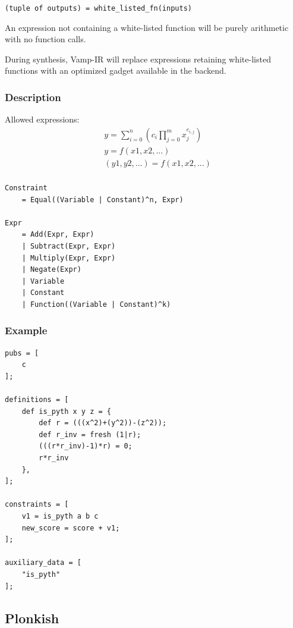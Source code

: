 \documentclass[
    9pt,            %
    techreport,        %
    affiltop,       %
]{art}
\begin{document}
\texttt{(tuple of outputs) = white\_listed\_fn(inputs)}

An expression not containing a white-listed function will be purely arithmetic with no function calls.

During synthesis, Vamp-IR will replace expressions retaining white-listed functions with an optimized gadget available in the backend. 

\subsubsection{Description}

Allowed expressions:
\begin{align*}
  &y = \sum_{i=0}^n\left(c_i\prod_{j=0}^m x_j^{e_{i,j}}\right)\\
  &y = f(x1, x2, ...)\\
  &(y1, y2, ...) = f(x1, x2, ...)\\
\end{align*}
  
\begin{verbatim}
Constraint
    = Equal((Variable | Constant)^n, Expr)

Expr 
    = Add(Expr, Expr) 
    | Subtract(Expr, Expr)
    | Multiply(Expr, Expr)
    | Negate(Expr)
    | Variable
    | Constant
    | Function((Variable | Constant)^k)
\end{verbatim}



\subsubsection{Example}

\begin{verbatim}
pubs = [
    c
];

definitions = [
    def is_pyth x y z = {
        def r = (((x^2)+(y^2))-(z^2));
        def r_inv = fresh (1|r);
        (((r*r_inv)-1)*r) = 0;
        r*r_inv
    },
];

constraints = [
    v1 = is_pyth a b c
    new_score = score + v1;
];

auxiliary_data = [
    "is_pyth"
];
\end{verbatim}

\subsection{Plonkish}
\end{document}
